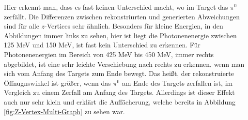 \documentclass[a4paper,11pt,oneside,final,german,openbib,pdftex]{scrbook}
\begin{document}
{Hier erkennt man, dass es fast keinen Unterschied macht, wo im Target das $\pi^0$ zerf\"allt. Die Differenzen zwischen rekonstriurten und generierten Abweichungen sind f\"ur alle $z$-Vertices sehr \"ahnlich. Besonders f\"ur kleine Energien, in den Abbildungen immer links zu sehen, hier ist liegt die Photonenenergie zwischen 125 MeV und 150 MeV, ist fast kein Unterschied zu erkennen. F\"ur Photonenenergien im Bereich von 425 MeV bis 450 MeV, immer rechts abgebildet, ist eine sehr leichte Verschiebung nach rechts zu erkennen, wenn man sich vom Anfang des Targets zum Ende bewegt. Das hei{\ss}t, der rekonstruierte \"Offnugnswinkel ist gr\"o{\ss}er, wenn das $\pi^0$ am Ende des Targets zerfallen ist, im Vergleich zu einem Zerfall am Anfang des Targets. Allerdings ist dieser Effekt auch nur sehr klein und erkl\"art die Auff\"acherung, welche bereits in Abbildung \ref{fig:Z-Vertex-Multi-Graph} zu sehen war.


}
\end{document}
